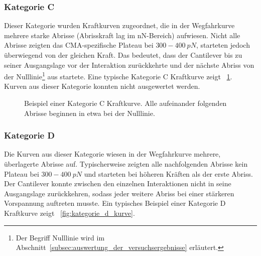 \subsubsection{Kategorie C}
\label{subsubsec:kategorie_c}

Dieser Kategorie wurden Kraftkurven zugeordnet, die in der Wegfahrkurve mehrere starke Abrisse (Abrisskraft lag im nN-Bereich) aufwiesen. Nicht alle Abrisse zeigten das \ac{CMA}-spezifische Plateau bei $300 - 400~pN$, starteten jedoch überwiegend von der gleichen Kraft. Das bedeutet, dass der Cantilever bis zu seiner Ausgangslage vor der Interaktion zurückkehrte und der nächste Abriss von der Nulllinie\footnote{Der Begriff Nulllinie wird im Abschnitt~\ref{subsec:auswertung_der_versuchsergebnisse} erläutert.} aus startete. Eine typische Kategorie C Kraftkurve zeigt \abb~\ref{fig:kategorie_c_kurve}. Kurven aus dieser Kategorie konnten nicht ausgewertet werden.

\begin{figure}[H]
	\centering
	\caption[Beispiel einer Kategorie C Kraftkurve]{Beispiel einer Kategorie C Kraftkurve. Alle aufeinander folgenden Abrisse beginnen in etwa bei der Nulllinie.}
	\label{fig:kategorie_c_kurve}
\end{figure}

\subsubsection{Kategorie D}
\label{subsubsec:kategorie_d}

Die Kurven aus dieser Kategorie wiesen in der Wegfahrkurve mehrere, überlagerte Abrisse auf. Typischerweise zeigten alle nachfolgenden Abrisse kein Plateau bei $300 - 400~pN$ und starteten bei höheren Kräften als der erste Abriss. Der Cantilever konnte zwischen den einzelnen Interaktionen nicht in seine Ausgangslage zurückkehren, sodass jeder weitere Abriss bei einer stärkeren Vorspannung auftreten musste. Ein typisches Beispiel einer Kategorie D Kraftkurve zeigt \abb~\ref{fig:kategorie_d_kurve}.

